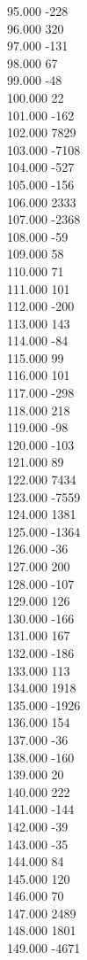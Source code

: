 { 95.000	-228 \\
 96.000	320 \\
 97.000	-131 \\
 98.000	67 \\
 99.000	-48 \\
 100.000	22 \\
 101.000	-162 \\
 102.000	7829 \\
 103.000	-7108 \\
 104.000	-527 \\
 105.000	-156 \\
 106.000	2333 \\
 107.000	-2368 \\
 108.000	-59 \\
 109.000	58 \\
 110.000	71 \\
 111.000	101 \\
 112.000	-200 \\
 113.000	143 \\
 114.000	-84 \\
 115.000	99 \\
 116.000	101 \\
 117.000	-298 \\
 118.000	218 \\
 119.000	-98 \\
 120.000	-103 \\
 121.000	89 \\
 122.000	7434 \\
 123.000	-7559 \\
 124.000	1381 \\
 125.000	-1364 \\
 126.000	-36 \\
 127.000	200 \\
 128.000	-107 \\
 129.000	126 \\
 130.000	-166 \\
 131.000	167 \\
 132.000	-186 \\
 133.000	113 \\
 134.000	1918 \\
 135.000	-1926 \\
 136.000	154 \\
 137.000	-36 \\
 138.000	-160 \\
 139.000	20 \\
 140.000	222 \\
 141.000	-144 \\
 142.000	-39 \\
 143.000	-35 \\
 144.000	84 \\
 145.000	120 \\
 146.000	70 \\
 147.000	2489 \\
 148.000	1801 \\
 149.000	-4671 \\
}
